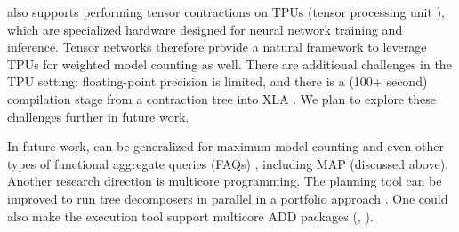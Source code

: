  also supports performing tensor contractions on TPUs (tensor processing unit \cite{JYPPABBBBB17}), which are specialized hardware designed for neural network training and inference. Tensor networks therefore provide a natural framework to leverage TPUs for weighted model counting as well. There are additional challenges in the TPU setting: floating-point precision is limited, and there is a (100+ second) compilation stage from a contraction tree into XLA \cite{XLA}. We plan to explore these challenges further in future work.


In future work, \procount{} can be generalized for maximum model counting \cite{fremont2017maximum} and even other types of functional aggregate queries (FAQs) \cite{KNR16}, including MAP (discussed above). Another research direction is multicore programming. The planning tool \Lg{} can be improved to run tree decomposers in parallel \cite{dudek2020parallel} in a portfolio approach \cite{XHHL08}. One could also make the execution tool \Dmc{} support multicore ADD packages (\eg, \sylvan{} \cite{van2015sylvan}).
